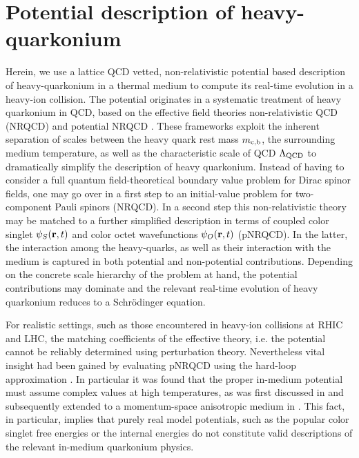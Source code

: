 
\section{Potential description of heavy-quarkonium}
\label{sec:pot}

Herein, we use a lattice QCD vetted, non-relativistic potential based description of heavy-quarkonium in a thermal medium to compute its real-time evolution in a heavy-ion collision. The potential originates in a systematic treatment of heavy quarkonium in QCD, based on the effective field theories non-relativistic QCD (NRQCD) and potential NRQCD \cite{Brambilla:2004jw,Brambilla:2008cx}. These frameworks exploit the inherent separation of scales between the heavy quark rest mass $m_{\rm c,b}$, the surrounding medium temperature, as well as the characteristic scale of QCD $\Lambda_{\rm QCD}$ to dramatically simplify the description of heavy quarkonium. Instead of having to consider a full quantum field-theoretical boundary value problem for Dirac spinor fields, one may go over in a first step to an initial-value problem for two-component Pauli spinors (NRQCD). In a second step this non-relativistic theory may be matched to a further simplified description in terms of coupled color singlet $ \psi_S({\bf r},t)$ and color octet wavefunctions $ \psi_O({\bf r},t)$ (pNRQCD). In the latter, the interaction among the heavy-quarks, as well as their interaction with the medium is captured in both potential and non-potential contributions. Depending on the concrete scale hierarchy of the problem at hand, the potential contributions may dominate and the relevant real-time evolution of heavy quarkonium reduces to a Schr\"odinger equation. 

For realistic settings, such as those encountered in heavy-ion collisions at RHIC and LHC, the matching coefficients of the effective theory, i.e. the potential cannot be reliably determined using perturbation theory. Nevertheless vital insight had been gained by evaluating pNRQCD using the hard-loop approximation \cite{Laine:2006ns,Brambilla:2008cx}. In particular it was found that  the proper in-medium potential must assume complex values at high temperatures, as was first discussed in \cite{Laine:2006ns} and subsequently extended to a momentum-space anisotropic medium in \cite{Dumitru:2007hy,Burnier:2009yu,Dumitru:2009fy,Nopoush:2017zbu}. This fact, in particular, implies that purely real model potentials, such as the popular color singlet free energies or the internal energies do not constitute valid descriptions of the relevant in-medium quarkonium physics. 

